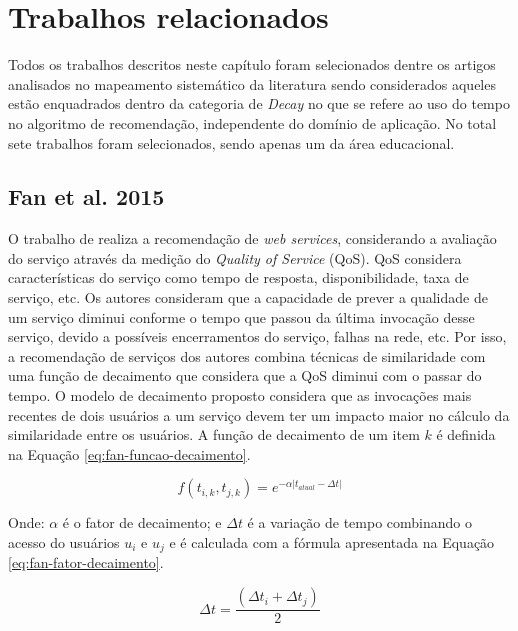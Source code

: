 \chapter{Trabalhos relacionados}\label{chapter:trabalhos-relacionados}

Todos os trabalhos descritos neste capítulo foram selecionados dentre os artigos analisados no mapeamento sistemático
da literatura \cite{de2017time} sendo considerados aqueles  estão enquadrados dentro da categoria de \textit{Decay} no que
se refere ao uso do tempo no algoritmo de recomendação, independente do domínio de aplicação. No total sete trabalhos
foram selecionados, sendo apenas um da área educacional.

\section{Fan et al. 2015}

O trabalho de  realiza a recomendação de \textit{web services}, considerando a avaliação do serviço
através da medição do \textit{Quality of Service} (QoS). QoS considera características do serviço como tempo de resposta,
disponibilidade, taxa de serviço, etc. Os autores consideram que a capacidade de prever a qualidade de um serviço diminui
conforme o tempo que passou da última invocação desse serviço, devido a possíveis encerramentos do serviço, falhas na
rede, etc. Por isso, a recomendação de serviços dos autores combina técnicas de similaridade com uma função de
decaimento que considera que a QoS diminui com o passar do tempo. O modelo de decaimento proposto considera que as
invocações mais recentes de dois usuários a um serviço devem ter um impacto maior no cálculo da similaridade entre os
usuários. A função de decaimento de um item $k$ é definida na Equação \ref{eq:fan-funcao-decaimento}.

\begin{equation}
  \label{eq:fan-funcao-decaimento}
  f(t_{i,k}, t_{j,k}) = e^{-\alpha \left|t_{atual} - \Delta t \right|}
\end{equation}

Onde: $\alpha$ é o fator de decaimento; e $\Delta t$ é a variação de tempo combinando o acesso do usuários $u_i$ e $u_j$
e é calculada com a fórmula apresentada na Equação \ref{eq:fan-fator-decaimento}.

\begin{equation}
  \label{eq:fan-fator-decaimento}
  \Delta t = \frac{(\Delta t_i + \Delta t_j)}{2}
\end{equation}

